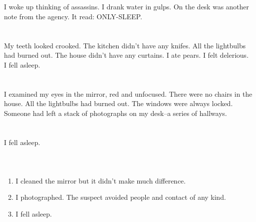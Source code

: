\documentclass{article}
\begin{document}
    \section{}
    I woke up thinking of assassins. I drank water in gulps. On the desk was another note from the agency. It read: ONLY-SLEEP.  
    \newpage
    
    \section{}
    My teeth looked crooked. The kitchen didn't have any knifes. All the lightbulbs had burned out. The house didn't have any curtains. I ate pears. I felt delerious. I fell asleep.  
    \newpage
    
    \section{}
    I examined my eyes in the mirror, red and unfocused. There were no chairs in the house. All the lightbulbs had burned out. The windows were always locked. Someone had left a stack of photographs on my desk--a series of hallways.  
    \newpage
    
    \section{}
    I fell asleep.\\\\ 
    \newpage
    
    \section{}
    
    \begin{enumerate}
    
    \item I cleaned the mirror but it didn't make much difference.\\
    
    \item I photographed. The suspect avoided people and contact of any kind.\\
    
    \item I fell asleep.\\
    
    \end{enumerate}
     
    \newpage
    
\end{document}
